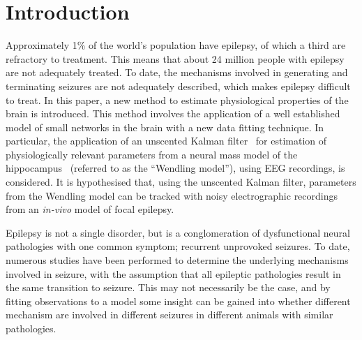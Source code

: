 \section{Introduction}


Approximately 1\% of the world's population have epilepsy, of which a third are refractory to treatment. This means that about 24 million people with epilepsy are not adequately treated. To date, the mechanisms involved in generating and terminating seizures are not adequately described, which makes epilepsy difficult to treat. In this paper, a new method to estimate physiological properties of the brain is introduced. This method involves the application of a well established model of small networks in the brain with a new data fitting technique. In particular, the application of an unscented Kalman filter~\citep{voss2004nonlinear} for estimation of physiologically relevant parameters from a neural mass model of the hippocampus~\citep{wendling2002epileptic} (referred to as the ``Wendling model''), using EEG recordings, is considered. It is hypothesised that, using the unscented Kalman filter, parameters from the Wendling model can be tracked with noisy electrographic recordings from an \textsl{in-vivo} model of focal epilepsy.

Epilepsy is not a single disorder, but is a conglomeration of dysfunctional neural pathologies with one common symptom; recurrent unprovoked seizures. To date, numerous studies have been performed to determine the underlying mechanisms involved in seizure, with the assumption that all epileptic pathologies result in the same transition to seizure. This may not necessarily be the case, and by fitting observations to a model some insight can be gained into whether different mechanism are involved in different seizures in different animals with similar pathologies. 


